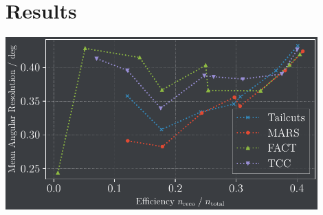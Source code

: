 \section{Results}%
\label{sec:results}

\begin{frame}
    \centering
    \includegraphics[width=0.9\textwidth]{build/ar_vs_eff.pdf}
\end{frame}

